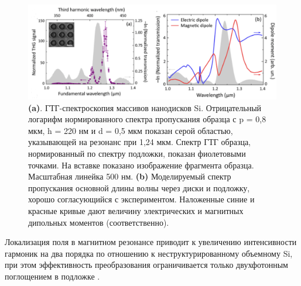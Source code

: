 \begin{figure}[h!]
    \centering
	\includegraphics[width=0.8\linewidth]{images/fig3.png}
	\caption{\textbf{(a)}. ГТГ-спектроскопия массивов нанодисков Si. Отрицательный логарифм нормированного спектра пропускания образца с p = 0,8 мкм, h = 220 нм и d = 0,5 мкм показан серой областью, указывающей на резонанс при 1,24 мкм. Спектр ГТГ образца, нормированный по спектру подложки, показан фиолетовыми точками. На вставке показано изображение фрагмента образца. Масштабная линейка  500 нм. \textbf{(b)} Моделируемый спектр пропускания основной длины волны через диски и подложку, хорошо согласующийся с экспериментом. Наложенные синие и красные кривые дают величину электрических и магнитных дипольных моментов (соответственно). \cite{shcherbakov2014enhanced}}
	\label{nonliner:nanodisks}
\end{figure}
\hspace*{2mm}
Локализация поля в магнитном резонансе приводит к увеличению интенсивности гармоник на два порядка по отношению к неструктурированному объемному Si, при этом эффективность преобразования ограничивается только двухфотонным поглощением в подложке \cite{shcherbakov2014enhanced}. 


